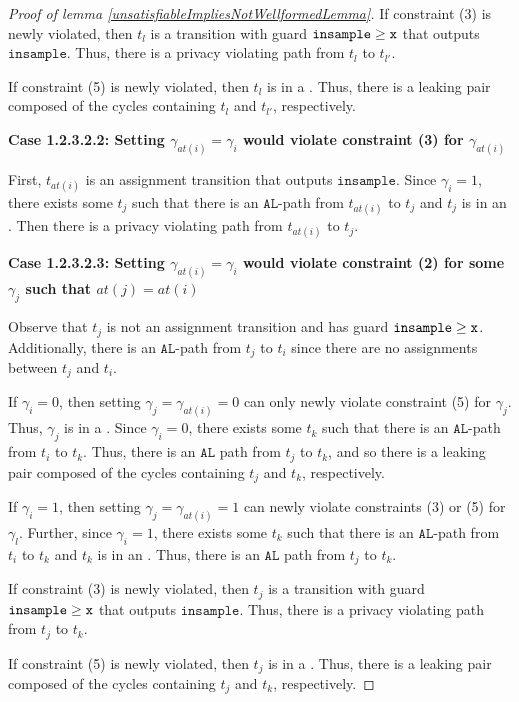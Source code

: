 \begin{proof}[Proof of lemma \ref{unsatisfiableImpliesNotWellformedLemma}]
    If constraint (3) is newly violated, then $t_l$ is a transition with guard $\gguard[\texttt{x}]$ that outputs $\texttt{insample}$. Thus, there is a privacy violating path from $t_l$ to $t_{l'}$. 

    If constraint (5) is newly violated, then $t_l$ is in a \gcycle. Thus, there is a leaking pair composed of the cycles containing $t_l$ and $t_{l'}$, respectively.

    \textbf{Case 1.2.3.2.2: Setting $\gamma_{at(i)}=\gamma_i$ would violate constraint (3) for $\gamma_{at(i)}$}

    First, $t_{at(i)}$ is an assignment transition that outputs $\texttt{insample}$. Since $\gamma_i = 1$, there exists some $t_j$ such that there is an $\texttt{AL}$-path from $t_{at(i)}$ to $t_j$ and $t_j$ is in an \lcycle. Then there is a privacy violating path from $t_{at(i)}$ to $t_j$.

    \textbf{Case 1.2.3.2.3: Setting $\gamma_{at(i)}=\gamma_i$ would violate constraint (2) for some $\gamma_j$ such that $at(j) = at(i)$}

    Observe that $t_j$ is not an assignment transition and has guard $\gguard[\texttt{x}]$. Additionally, there is an $\texttt{AL}$-path from $t_j$ to $t_i$ since there are no assignments between $t_j$ and $t_i$. 

    If $\gamma_i =0$, then setting $\gamma_j = \gamma_{at(i)} = 0$ can only newly violate constraint (5) for $\gamma_j$. Thus, $\gamma_j$ is in a \gcycle. Since $\gamma_i = 0$, there exists some $t_{k}$ such that there is an $\texttt{AL}$-path from $t_i$ to $t_{k}$. Thus, there is an $\texttt{AL}$ path from $t_j$ to $t_{k}$, and so there is a leaking pair composed of the cycles containing $t_j$ and $t_{k}$, respectively. 

    If $\gamma_i = 1$, then setting $\gamma_j = \gamma_{at(i)}=1$ can newly violate constraints (3) or (5) for $\gamma_l$. Further, since $\gamma_i =1$, there exists some $t_{k}$ such that there is an $\texttt{AL}$-path from $t_i$ to $t_{k}$ and $t_{k}$ is in an \lcycle. Thus, there is an $\texttt{AL}$ path from $t_j$ to $t_{k}$.
    
    If constraint (3) is newly violated, then $t_j$ is a transition with guard $\gguard[\texttt{x}]$ that outputs $\texttt{insample}$. Thus, there is a privacy violating path from $t_j$ to $t_{k}$. 

    If constraint (5) is newly violated, then $t_j$ is in a \gcycle. Thus, there is a leaking pair composed of the cycles containing $t_j$ and $t_{k}$, respectively.


\end{proof}
